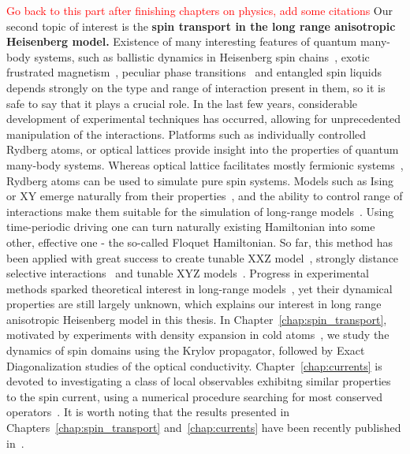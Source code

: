 \textcolor{red}{Go back to this part after finishing chapters on physics, add some citations}
Our second topic of interest is the \textbf{spin transport in the long range anisotropic Heisenberg model.}
Existence of many interesting features of quantum many-body systems, such as ballistic dynamics in Heisenberg spin
chains~\autocite{Zotos1997,Bertini2021},
exotic frustrated magnetism~\autocite{Nisoli2017}, peculiar phase transitions~\autocite{Sandvik2010b,Yang2021}
and entangled spin liquids~\autocite{Balents2010} depends strongly
on the type and range of interaction present in them, so it is safe to say that it plays a crucial role.
In the last few years, considerable development of experimental techniques has
occurred, allowing for unprecedented manipulation of the interactions.
Platforms such as individually controlled Rydberg atoms, or optical lattices provide insight into the
properties of quantum many-body systems. Whereas optical lattice facilitates mostly fermionic 
systems~\autocite{Bakr2009,Greif2016,Parsons2015,Boll2016}, Rydberg atoms can be used to simulate pure spin systems.
Models such as Ising or XY emerge naturally from their properties~\autocite{Browaeys2020}, and the ability to control
range of interactions make them suitable for the simulation of long-range models~\autocite{Borish2020}. Using time-periodic
driving one can turn naturally existing Hamiltonian into some other, effective one - the so-called Floquet Hamiltonian.
So far, this method has been applied with great success to create tunable XXZ model~\autocite{Scholl2022}, strongly distance
selective interactions~\autocite{Hollerith2022} and tunable XYZ models~\autocite{Steinert2022, Geier2021}.
Progress in experimental methods sparked theoretical interest in long-range
models~\autocite{Richerme2014,Jurcevic2014,Hauke2013,FossFeig2015,Maghrebi2016,Lepori2017,Frerot2017,Vanderstraeten2018,Cevolani2018,Kloss2019,Ren2020,Bulchandani2022a},
yet their dynamical properties are still largely unknown, which explains our interest in long range anisotropic
Heisenberg model in this thesis.
In Chapter~\ref{chap:spin_transport}, motivated by experiments with density expansion in cold atoms~\autocite{Ronzheimer2013,Vidmar2013,Neyenhuis2017},
we study the dynamics of spin domains using the Krylov propagator, followed by Exact Diagonalization studies of the optical conductivity.
Chapter~\ref{chap:currents} is devoted to investigating a class of local observables exhibitng similar properties
to the spin current, using a numerical procedure searching for most conserved operators~\autocite{Mierzejewski2015a}.
It is worth noting that the results presented in Chapters~\ref{chap:spin_transport} and~\ref{chap:currents} have
been recently published in~\textcite{Mierzejewski2023}.

